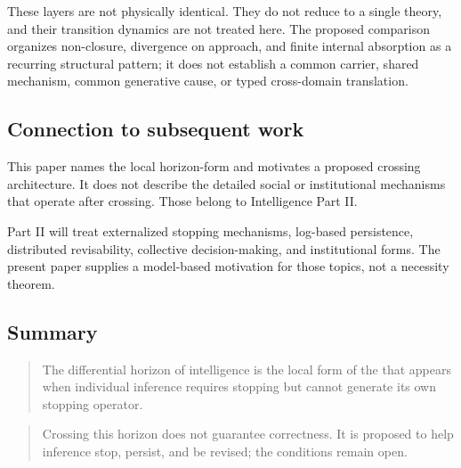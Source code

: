These layers are not physically identical. They do not reduce to a single theory, and their transition dynamics are not treated here. The proposed comparison organizes non-closure, divergence on approach, and finite internal absorption as a recurring structural pattern; it does not establish a common carrier, shared mechanism, common generative cause, or typed cross-domain translation.

\subsection{Connection to subsequent work}

This paper names the local horizon-form and motivates a proposed crossing architecture. It does not describe the detailed social or institutional mechanisms that operate after crossing. Those belong to Intelligence Part II.

Part II will treat externalized stopping mechanisms, log-based persistence, distributed revisability, collective decision-making, and institutional forms. The present paper supplies a model-based motivation for those topics, not a necessity theorem.

\subsection{Summary}

\begin{quote}
The differential horizon of intelligence is the local form of the \DH{} that appears when individual inference requires stopping but cannot generate its own stopping operator.
\end{quote}

\begin{quote}
Crossing this horizon does not guarantee correctness. It is proposed to help inference stop, persist, and be revised; the conditions remain open.
\end{quote}
